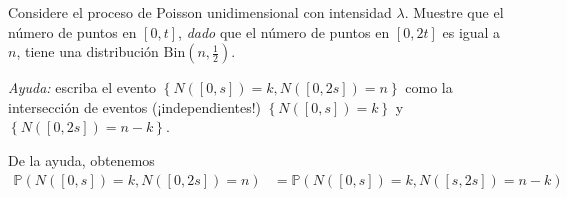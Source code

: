 \question

	Considere el proceso de Poisson unidimensional con intensidad $\lambda$. Muestre que el número de puntos en $\left[0,t\right]$, \emph{dado} que el número de puntos en $\left[0,2t\right]$ es igual a $n$, tiene una distribución $\mathrm{Bin}\left(n,\tfrac{1}{2}\right)$.
 
	\noindent\emph{Ayuda:} escriba el evento $\left\{N\left(\left[0,s\right]\right)=k,N\left(\left[0,2s\right]\right)=n\right\}$ como la intersección de eventos (¡independientes!) $\left\{N\left(\left[0,s\right]\right)=k\right\}$ y $\left\{N\left(\left[0,2s\right]\right)=n-k\right\}$.

	\begin{solutionordottedlines}
		De la ayuda, obtenemos
		\begin{align*}
			\mathds{P}\left(N\left(\left[0,s\right]\right)=k,N\left(\left[0,2s\right]\right)=n\right)
			&=\mathds{P}\left(N\left(\left[0,s\right]\right)=k,N\left(\left[s,2s\right]\right)=n-k\right)
		\end{align*}
	\end{solutionordottedlines}